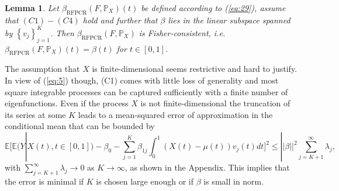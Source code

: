 \documentclass[11pt]{article}
\newtheorem{lem}{Lemma}[section]
\begin{document}
\begin{lem} \label{Fisher-cons}
Let $\beta_{{\scriptscriptstyle \text{RFPCR}}} \left(F, \mathbb{P}_X \right)(t)$ be defined according to (\ref{eq:29}), assume that $(C1)-(C4)$ hold and further that $\beta$ lies in the linear subspace spanned by $\left\{v_j \right\}_{j=1}^K$. Then $\beta_{{\scriptscriptstyle \text{RFPCR}}} \left(F, \mathbb{P}_X \right)$ is Fisher-consistent, i.e. $\beta_{{\scriptscriptstyle \text{RFPCR}}} \left(F, \mathbb{P}_X \right)(t) =  \beta(t)$ for $t \in [0,1]$. 
\end{lem}


The assumption that $X$ is finite-dimensional seems restrictive and hard to justify. In view of (\ref{eq:5}) though, (C1) comes with little loss of generality and most square integrable processes can be captured sufficiently with a finite number of eigenfunctions. Even if the process $X$ is not finite-dimensional the truncation of its series at some $K$ leads to a mean-squared  error of approximation in the conditional mean that can be bounded by
\begin{equation}
\label{eq:31}
\mathbb{E}[ \mathbb{E}(Y|X(t), t \in [0,1])- \beta_0 - \sum_{j=1}^K \beta_{1j} \int_{0}^1 \left(X(t)-\mu(t)\right) v_j(t) dt ]^2 \leq ||\beta||^2 \sum_{j=K+1}^\infty \lambda_j,
\end{equation}
with $\sum_{j=K+1}^\infty \lambda_j \to 0$ as $K \to \infty$, as shown in the Appendix. This implies that the error is minimal if $K$ is chosen large enough or if $\beta$ is small in norm. 
\end{document}
